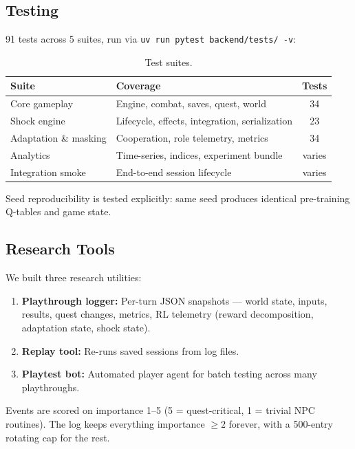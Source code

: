 \subsection{Testing}

91 tests across 5 suites, run via \texttt{uv run pytest backend/tests/ -v}:

\begin{table}[ht]
\centering
\caption{Test suites.}
\label{tab:tests}
\begin{tabular}{@{}llc@{}}
\toprule
Suite & Coverage & Tests \\
\midrule
Core gameplay & Engine, combat, saves, quest, world & 34 \\
Shock engine & Lifecycle, effects, integration, serialization & 23 \\
Adaptation \& masking & Cooperation, role telemetry, metrics & 34 \\
Analytics & Time-series, indices, experiment bundle & varies \\
Integration smoke & End-to-end session lifecycle & varies \\
\bottomrule
\end{tabular}
\end{table}

Seed reproducibility is tested explicitly: same seed produces identical pre-training Q-tables and game state.

\subsection{Research Tools}

We built three research utilities:
\begin{enumerate}
    \item \textbf{Playthrough logger:} Per-turn JSON snapshots --- world state, inputs, results, quest changes, metrics, RL telemetry (reward decomposition, adaptation state, shock state).
    \item \textbf{Replay tool:} Re-runs saved sessions from log files.
    \item \textbf{Playtest bot:} Automated player agent for batch testing across many playthroughs.
\end{enumerate}

Events are scored on importance 1--5 (5 = quest-critical, 1 = trivial NPC routines). The log keeps everything importance $\geq 2$ forever, with a 500-entry rotating cap for the rest.
